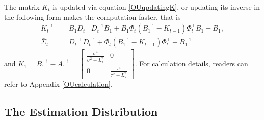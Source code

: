 The matrix $K_{t}$ is updated via equation \eqref{OUupdatingK}, or updating its inverse in the following form makes the computation faster, that is 
\begin{align}
K_{t}^{-1} &= B_1D_{t}^{-\top}D_{t}^{-1}B_1 + B_1\Phi_{t} \left(B_1^{-1} - K_{t-1}\right) \Phi_{t}^\top B_1+ B_1,\\
\bar{\Sigma}_{t} &= D_{t}^{-\top}D_{t}^{-1}+ \Phi_{t} \left(B_1^{-1} - K_{t-1}\right) \Phi_{t}^\top + B_1^{-1}
\end{align}
and $K_1 =B_1^{-1} - A_1^{-1} = \begin{bmatrix}
\frac{\sigma^4}{\sigma^2 +L_x^2} & 0 \\ 0 &\frac{\tau^4}{\tau^2 +L_u^2}
\end{bmatrix} $. For calculation details, readers can refer to Appendix \ref{OUcalculation}. 


\subsection{The Estimation Distribution}

